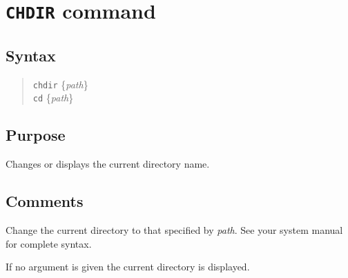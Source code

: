 %
%
%
%
\section{{\tt CHDIR} command}
\subsection{Syntax}
\begin{verse}
{\tt chdir} \{{\it path}\}\\
{\tt cd} \{{\it path}\}
\end{verse}
\subsection{Purpose}

Changes or displays the current directory name.
\subsection{Comments}

Change the current directory to that specified by {\it path}.  See your
system manual for complete syntax.

If no argument is given the current directory is displayed.
